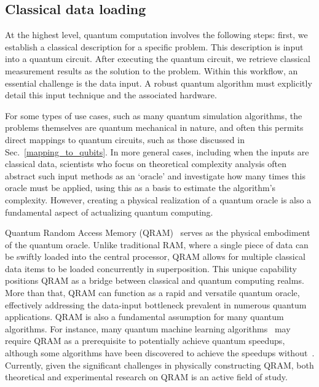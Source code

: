 \subsection{Classical data loading}
\label{classical-data-loading}


At the highest level, quantum computation involves the following steps: first, we establish a classical description for a specific problem. This description is input into a quantum circuit. After executing the quantum circuit, we retrieve classical measurement results as the solution to the problem. Within this workflow, an essential challenge is the data input. A robust quantum algorithm must explicitly detail this input technique and the associated hardware.

For some types of use cases, such as many quantum simulation algorithms, the problems themselves are quantum mechanical in nature, and often this permits direct mappings to quantum circuits, such as those discussed in Sec.~\ref{mapping_to_qubits}. In more general cases, including when the inputs are classical data, scientists who focus on theoretical complexity analysis often abstract such input methods as an `oracle' and investigate how many times this oracle must be applied, using this as a basis to estimate the algorithm's complexity. However, creating a physical realization of a quantum oracle is also a fundamental aspect of actualizing quantum computing.

Quantum Random Access Memory (QRAM)~\cite{giovannetti2008quantum} serves as the physical embodiment of the quantum oracle. Unlike traditional RAM, where a single piece of data can be swiftly loaded into the central processor, QRAM allows for multiple classical data items to be loaded concurrently in superposition. This unique capability positions QRAM as a bridge between classical and quantum computing realms. More than that, QRAM can function as a rapid and versatile quantum oracle, effectively addressing the data-input bottleneck prevalent in numerous quantum applications. QRAM is also a fundamental assumption for many quantum algorithms. For instance, many quantum machine learning algorithms~\cite{aaronson2015read,biamonte2017quantum} may require QRAM as a prerequisite to potentially achieve quantum speedups, although some algorithms have been discovered to achieve the speedups without~\cite{niroula2021quantum}. Currently, given the significant challenges in physically constructing QRAM, both theoretical and experimental research on QRAM is an active field of study.

